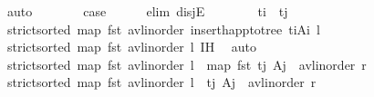 \begin{isabellebody}
\ auto\isanewline
\ \ \ \ \isamarkupfalse%
\ \isamarkupfalse%
\ {\isacharquery}{\kern0pt}case\isanewline
\ \ \ \ \isamarkupfalse%
\ {\isacharparenleft}{\kern0pt}elim\ disjE{\isacharparenright}{\kern0pt}\isanewline
\ \ \ \ \ \ \isamarkupfalse%
\ {\isachardoublequoteopen}t\isactrlsub i\ {\isacharless}{\kern0pt}\ t\isactrlsub j{\isachardoublequoteclose}\isanewline
\ \ \ \ \ \ \isamarkupfalse%
\ \isamarkupfalse%
\ {\isachardoublequoteopen}strict{\isacharunderscore}{\kern0pt}sorted\ {\isacharparenleft}{\kern0pt}map\ fst\ {\isacharparenleft}{\kern0pt}avl{\isacharunderscore}{\kern0pt}inorder\ {\isacharparenleft}{\kern0pt}insert{\isacharunderscore}{\kern0pt}happ{\isacharunderscore}{\kern0pt}to{\isacharunderscore}{\kern0pt}tree\ {\isacharparenleft}{\kern0pt}t\isactrlsub i{\isacharcomma}{\kern0pt}A\isactrlsub i{\isacharparenright}{\kern0pt}\ l{\isacharparenright}{\kern0pt}{\isacharparenright}{\kern0pt}{\isacharparenright}{\kern0pt}{\isachardoublequoteclose}\isanewline
\ \ \ \ \ \ \ \ \isamarkupfalse%
\ {\isacartoucheopen}strict{\isacharunderscore}{\kern0pt}sorted\ {\isacharparenleft}{\kern0pt}map\ fst\ {\isacharparenleft}{\kern0pt}avl{\isacharunderscore}{\kern0pt}inorder\ l{\isacharparenright}{\kern0pt}{\isacharparenright}{\kern0pt}{\isacartoucheclose}\ {\isachardoublequoteopen}{}{\isachardot}{\kern0pt}IH{\isachardoublequoteclose}\ \isamarkupfalse%
\ auto\isanewline
\isanewline
\ \ \ \ \ \ \isamarkupfalse%
\ {\isachardoublequoteopen}strict{\isacharunderscore}{\kern0pt}sorted\ {\isacharparenleft}{\kern0pt}map\ fst\ {\isacharparenleft}{\kern0pt}avl{\isacharunderscore}{\kern0pt}inorder\ l{\isacharparenright}{\kern0pt}\ {\isacharat}{\kern0pt}\ map\ fst\ {\isacharparenleft}{\kern0pt}{\isacharparenleft}{\kern0pt}t\isactrlsub j{\isacharcomma}{\kern0pt}\ A\isactrlsub j{\isacharparenright}{\kern0pt}\ {\isacharhash}{\kern0pt}\ avl{\isacharunderscore}{\kern0pt}inorder\ r{\isacharparenright}{\kern0pt}{\isacharparenright}{\kern0pt}{\isachardoublequoteclose}\isanewline
\ \ \ \ \ \ \ \ \isamarkupfalse%
\ {\isacartoucheopen}strict{\isacharunderscore}{\kern0pt}sorted\ {\isacharparenleft}{\kern0pt}map\ fst\ {\isacharparenleft}{\kern0pt}avl{\isacharunderscore}{\kern0pt}inorder\ l\ {\isacharat}{\kern0pt}\ {\isacharparenleft}{\kern0pt}t\isactrlsub j{\isacharcomma}{\kern0pt}\ A\isactrlsub j{\isacharparenright}{\kern0pt}\ {\isacharhash}{\kern0pt}\ avl{\isacharunderscore}{\kern0pt}inorder\ r{\isacharparenright}{\kern0pt}{\isacharparenright}{\kern0pt}{\isacartoucheclose}\ \isamarkupfalse%

\end{isabellebody}
